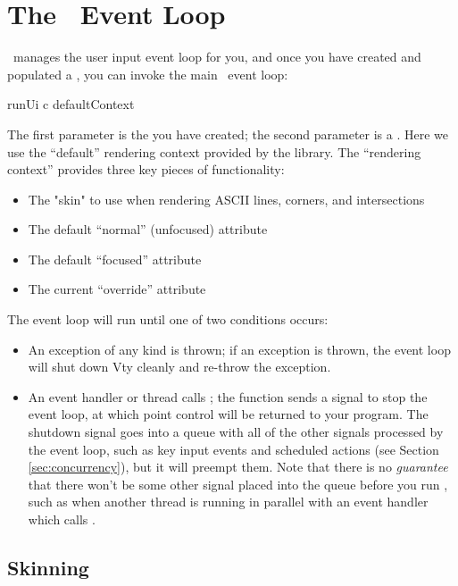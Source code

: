 \section{The \vtyui\ Event Loop}
\label{sec:event_loop}

\vtyui\ manages the user input event loop for you, and once you have
created and populated a , you can invoke the main
\vtyui\ event loop:

\begin{haskellcode}
 runUi c defaultContext
\end{haskellcode}

The first parameter is the  you have created; the
second parameter is a .  Here we use the
``default'' rendering context provided by the library.  The
``rendering context'' provides three key pieces of functionality:

\begin{itemize}
\item The "skin" to use when rendering ASCII lines, corners, and
      intersections
\item The default ``normal'' (unfocused) attribute
\item The default ``focused'' attribute
\item The current ``override'' attribute
\end{itemize}

The event loop will run until one of two conditions occurs:

\begin{itemize}
\item An exception of any kind is thrown; if an exception is thrown,
  the event loop will shut down Vty cleanly and re-throw the
  exception.
\item An event handler or thread calls ; the
   function sends a signal to stop the event loop, at
  which point control will be returned to your program.  The shutdown
  signal goes into a queue with all of the other signals processed by
  the event loop, such as key input events and scheduled actions (see
  Section \ref{sec:concurrency}), but it will preempt them.  Note that
  there is no \textit{guarantee} that there won't be some other signal
  placed into the queue before you run , such as when
  another thread is running in parallel with an event handler which
  calls .
\end{itemize}

\subsection{Skinning}
\label{sec:skinning}

